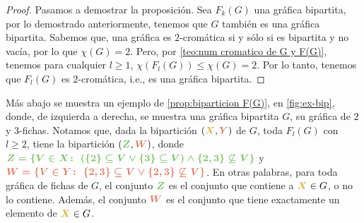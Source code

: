 \begin{proof}
    Pasamos a demostrar la proposici\'on. Sea $F_k(G)$ una gr\'afica bipartita,
    por lo demostrado anteriormente, tenemos que $G$ tambi\'en es una gr\'afica
    bipartita. Sabemos que, una gr\'afica es $2$-crom\'atica si y s\'olo si es
    bipartita y no vac\'ia, por lo que $\chi(G)=2$. Pero, por \cref{teo:num
    cromatico de G y F(G)}, tenemos para cualquier $l\geq 1$, $\chi (F_l(G)) \le
    \chi (G) = 2$. Por lo tanto, tenemos que $F_l(G)$ es $2$-crom\'atica, i.e.,
    es una gr\'afica bipartita.
\end{proof}


M\'as abajo se muestra un ejemplo de \cref{prop:biparticion F(G)}, en
\cref{fig:ex-bip}, donde, de izquierda a derecha, se muestra una gr\'afica
bipartita $G$, su gr\'afica de $2$ y $3$-fichas. Notamos que, dada la
bipartici\'on $({\color{oro}\boldsymbol {X}},{\color{salmon}\boldsymbol {Y}})$
de $G$, toda $F_l(G)$ con $l\geq 2$, tiene la bipartici\'on $({\color{verde}
\boldsymbol {Z}},{\color{salmon}\boldsymbol {W}})$, donde
${\color{verde}\boldsymbol {Z=\{V\in X\colon\ (\{2\}\subseteq V  \lor \{3\}
\subseteq V) \land \{2,3\}\not\subseteq V\}}}$ y ${\color{salmon}\boldsymbol
{W=\{V \in Y\colon\ \{2,3\}\subseteq V \lor \{2,3\}\not\subseteq V\}}}$. En
otras palabras, para toda gr\'afica de fichas de $G$, el conjunto
${\color{verde}\boldsymbol {Z}}$ es el conjunto que contiene a
${\color{oro}\boldsymbol {X}}\in G$, o no lo contiene. Adem\'as, el conjunto
${\color{salmon}\boldsymbol {W}}$ es el conjunto que tiene exactamente un
elemento de ${\color{oro}\boldsymbol {X}}\in G$.

